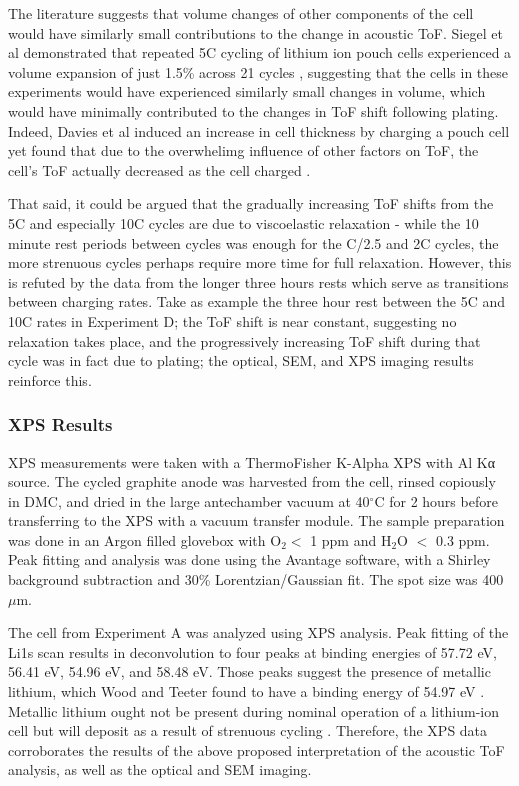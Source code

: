 The literature suggests that volume changes of other components of the cell would have similarly small contributions to the change in acoustic ToF. Siegel et al demonstrated that repeated 5C cycling of lithium ion pouch cells experienced a volume expansion of just 1.5\% across 21 cycles \cite{EXPANSION}, suggesting that the cells in these experiments would have experienced similarly small changes in volume, which would have minimally contributed to the changes in ToF shift following plating. Indeed, Davies et al induced an increase in cell thickness by charging a pouch cell yet found that due to the overwhelimg influence of other factors on ToF, the cell's ToF actually decreased as the cell charged \cite{SOC-SOH-EST}.

That said, it could be argued that the gradually increasing ToF shifts from the 5C and especially 10C cycles are due to viscoelastic relaxation - while the 10 minute rest periods between cycles was enough for the C/2.5 and 2C cycles, the more strenuous cycles perhaps require more time for full relaxation. However, this is refuted by the data from the longer three hours rests which serve as transitions between charging rates. Take as example the three hour rest between the 5C and 10C rates in Experiment D; the ToF shift is near constant, suggesting no relaxation takes place, and the progressively increasing ToF shift during that cycle was in fact due to plating; the optical, SEM, and XPS imaging results reinforce this.

\subsubsection{XPS Results}
XPS measurements were taken with a ThermoFisher K-Alpha XPS with Al Kα source. The cycled graphite anode was harvested from the cell, rinsed copiously in DMC, and dried in the large antechamber vacuum at 40$^{\circ}$C for 2 hours before transferring to the XPS with a vacuum transfer module. The sample preparation was done in an Argon filled glovebox with O$_2 <$ 1 ppm and H$_2$O $<$ 0.3 ppm. Peak fitting and analysis was done using the Avantage software, with a Shirley background subtraction and 30\% Lorentzian/Gaussian fit. The spot size was 400 $\mu$m.

The cell from Experiment A was analyzed using XPS analysis. Peak fitting of the Li1s scan results in deconvolution to four peaks at binding energies of 57.72 eV, 56.41 eV, 54.96 eV, and 58.48 eV. Those peaks suggest the presence of metallic lithium, which Wood and Teeter found to have a binding energy of 54.97 eV \cite{BE}. Metallic lithium ought not be present during nominal operation of a lithium-ion cell but will deposit as a result of strenuous cycling \cite{lithium}. Therefore, the XPS data corroborates the results of the above proposed interpretation of the acoustic ToF analysis, as well as the optical and SEM imaging.

